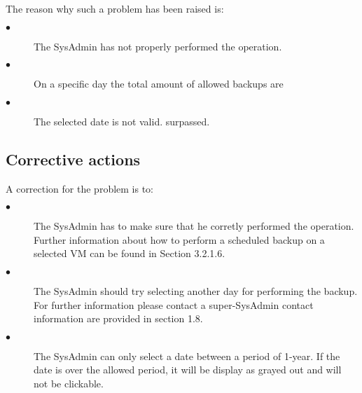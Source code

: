 The reason why such a problem has been raised is:\\
\begin{description}
  \item[$\bullet$] The SysAdmin has not properly performed the operation.
  \item[$\bullet$] On a specific day the total amount of allowed backups are
  \item[$\bullet$] The selected date is not valid.
surpassed.
\end{description}


\subsection{Corrective actions}

A correction for the problem is to:\\
\begin{description}
  \item[$\bullet$] The SysAdmin has to make sure that he corretly performed the operation. 
Further information about how to perform a scheduled backup on a selected VM can be found in 
Section 3.2.1.6.
  \item[$\bullet$] The SysAdmin should try selecting another day for performing the backup. 
For further information please contact a super-SysAdmin
contact information are provided in section 1.8.
  \item[$\bullet$] The SysAdmin can only select a date between a period of 1-year. If the date
is over the allowed period, it will be display as grayed out and will not be clickable.
\end{description}








